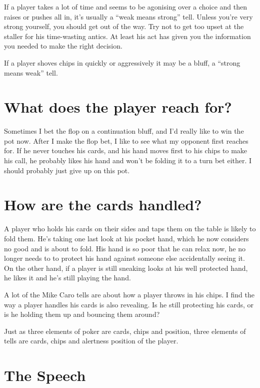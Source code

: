 If a player takes a lot of time and seems to be agonising over a choice
and then raises or pushes all in, it's usually a ``weak means strong'' tell.
Unless you're very strong yourself, you should get out
of the way. Try not to get too upset at the staller for
his time-wasting antics. At least his act has given you the
information you needed to make the right decision.

If a player shoves chips in quickly or aggressively it may be a bluff,
a ``strong means weak'' tell.

\section{What does the player reach for?}

Sometimes I bet the flop on a continuation bluff, and I'd really like
to win the pot now. After I make the flop bet, I like to see what
my opponent first reaches for. If he never touches his cards, and his
hand moves first to his chips to make his call, he probably likes his
hand and won't be folding it to a turn bet either. I should probably
just give up on this pot.

\section{How are the cards handled?}

A player who holds his cards on their sides and taps them on
the table is likely to fold them. He's taking one last look
at his pocket hand, which he now considers no good and is about
to fold. His hand is so poor that he can relax now, he no longer
needs to to protect his hand against someone else accidentally seeing it.
On the other hand, if a player is still sneaking looks at his
well protected hand, he likes it and he's still playing the hand.

A lot of the Mike Caro tells are about how a player
throws in his chips. I find the way a player
handles his cards is also revealing. Is he still protecting
his cards, or is he holding them up and bouncing them around?

Just as three elements of poker are cards, chips and position,
three elements of tells are cards, chips and alertness position
of the player.

\section{The Speech}

